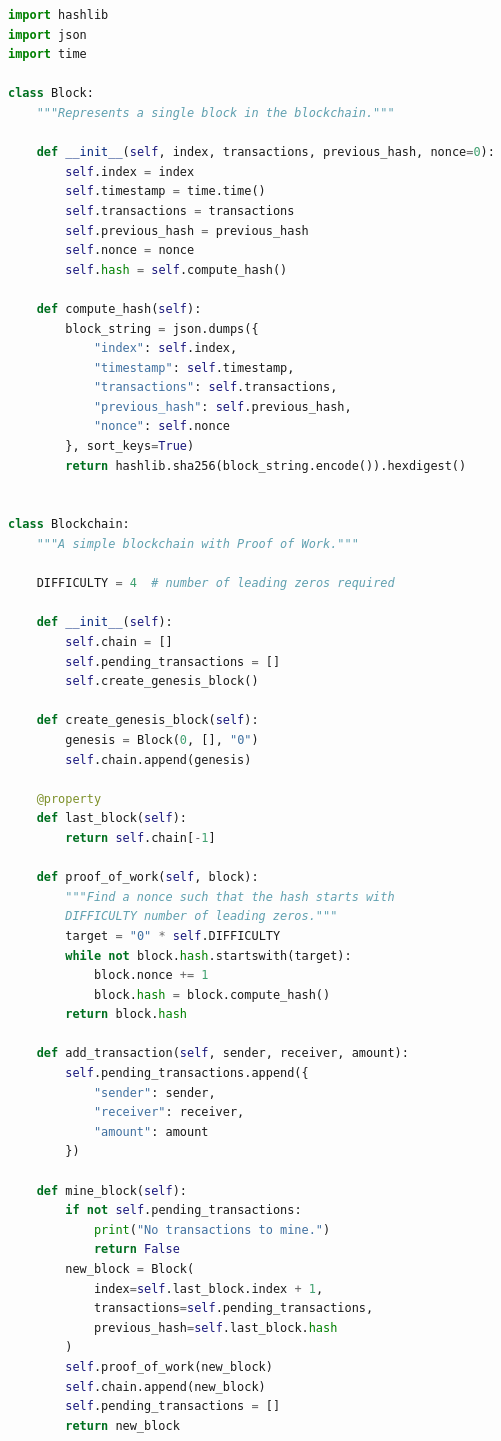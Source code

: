 \begin{lstlisting}[language=Python, caption={A minimal blockchain implementation in Python.}, label={lst:blockchain}]
import hashlib
import json
import time

class Block:
    """Represents a single block in the blockchain."""

    def __init__(self, index, transactions, previous_hash, nonce=0):
        self.index = index
        self.timestamp = time.time()
        self.transactions = transactions
        self.previous_hash = previous_hash
        self.nonce = nonce
        self.hash = self.compute_hash()

    def compute_hash(self):
        block_string = json.dumps({
            "index": self.index,
            "timestamp": self.timestamp,
            "transactions": self.transactions,
            "previous_hash": self.previous_hash,
            "nonce": self.nonce
        }, sort_keys=True)
        return hashlib.sha256(block_string.encode()).hexdigest()


class Blockchain:
    """A simple blockchain with Proof of Work."""

    DIFFICULTY = 4  # number of leading zeros required

    def __init__(self):
        self.chain = []
        self.pending_transactions = []
        self.create_genesis_block()

    def create_genesis_block(self):
        genesis = Block(0, [], "0")
        self.chain.append(genesis)

    @property
    def last_block(self):
        return self.chain[-1]

    def proof_of_work(self, block):
        """Find a nonce such that the hash starts with
        DIFFICULTY number of leading zeros."""
        target = "0" * self.DIFFICULTY
        while not block.hash.startswith(target):
            block.nonce += 1
            block.hash = block.compute_hash()
        return block.hash

    def add_transaction(self, sender, receiver, amount):
        self.pending_transactions.append({
            "sender": sender,
            "receiver": receiver,
            "amount": amount
        })

    def mine_block(self):
        if not self.pending_transactions:
            print("No transactions to mine.")
            return False
        new_block = Block(
            index=self.last_block.index + 1,
            transactions=self.pending_transactions,
            previous_hash=self.last_block.hash
        )
        self.proof_of_work(new_block)
        self.chain.append(new_block)
        self.pending_transactions = []
        return new_block


\end{lstlisting}
